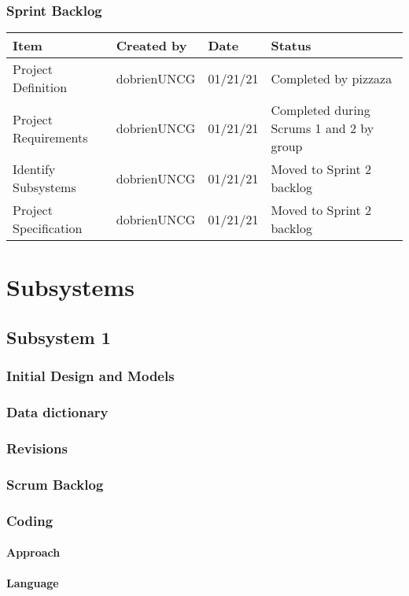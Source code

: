 \documentclass{article}
\begin{document}
\subsubsection{Sprint Backlog}
\begin{tabular}{|p{}| p{}|p{}|p{}|}
\hline
Item & Created by & Date & Status\\\hline
Project Definition & dobrienUNCG  & 01/21/21 &  Completed by pizzaza\\\hline
Project Requirements & dobrienUNCG & 01/21/21  & Completed during Scrums 1 and 2 by group\\\hline
Identify Subsystems & dobrienUNCG & 01/21/21 & Moved to Sprint 2 backlog\\\hline
Project Specification & dobrienUNCG & 01/21/21 & Moved to Sprint 2 backlog \\\hline
\end{tabular}


\newpage
\section{Subsystems}
\subsection{Subsystem 1}
\subsubsection{Initial Design and Models}
\subsubsection{Data dictionary}
\subsubsection{Revisions}
\subsubsection{Scrum Backlog } %
\subsubsection{Coding}
\paragraph{Approach}
\paragraph{Language}
\end{document}
